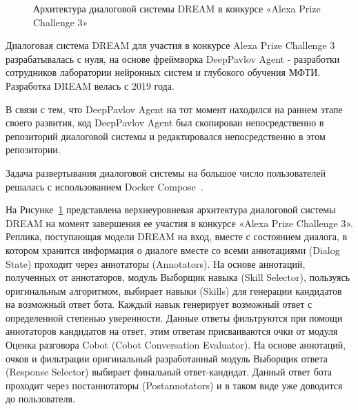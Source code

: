 \begin{figure}[ht]
  \caption{Архитектура диалоговой системы {DREAM} в конкурсе «Alexa Prize Challenge 3»}\label{fig:Alexa1}
\end{figure}


Диалоговая система {DREAM} для участия в конкурсе Alexa Prize Challenge 3 разрабатывалась с нуля, на основе фреймворка DeepPavlov Agent -  разработки сотрудников лаборатории нейронных систем и глубокого обучения МФТИ. Разработка {DREAM} велась с 2019 года.

В связи с тем, что DeepPavlov Agent на тот момент находился на раннем этапе своего развития, код DeepPavlov Agent был скопирован непосредственно в репозиторий диалоговой системы и редактировался непосредственно в этом репозитории.

Задача развертывания диалоговой системы на большое число пользователей решалась с использованием Docker Compose~\cite{na_website_ndk}.

На Рисунке~\ref{fig:Alexa1} представлена верхнеуровневая архитектура диалоговой системы {DREAM} на момент завершения ее участия в конкурсе «Alexa Prize Challenge 3». Реплика, поступающая модели {DREAM} на вход, вместе с состоянием диалога, в котором хранится информация о диалоге вместе со всеми аннотациями (Dialog State) проходит через аннотаторы (Annotators). На основе аннотаций, полученных от аннотаторов, модуль Выборщик навыка (Skill Selector), пользуясь оригинальным алгоритмом, выбирает навыки (Skills) для генерации кандидатов на возможный ответ бота. Каждый навык генерирует возможный ответ с определенной степенью уверенности. Данные ответы фильтруются при помощи аннотаторов кандидатов на ответ, этим ответам присваиваются очки от модуля Оценка разговора Cobot (Cobot Conversation Evaluator). На основе аннотаций, очков и фильтрации оригинальный разработанный модуль Выборщик ответа (Response Selector) выбирает финальный ответ-кандидат. Данный ответ бота проходит через постаннотаторы (Postannotators) и в таком виде уже доводится до пользователя.

